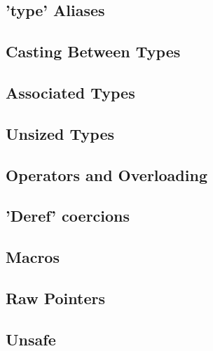 \subsection{'type' Aliases}
\label{sec:syntax_typeAliases}


\subsection{Casting Between Types}
\label{sec:syntax_casting}


\subsection{Associated Types}
\label{sec:syntax_associatedTypes}


\subsection{Unsized Types}
\label{sec:syntax_unsizedTypes}


\subsection{Operators and Overloading}
\label{sec:syntax_operatorsAndOverloading}


\subsection{'Deref' coercions}
\label{sec:syntax_derefCoercions}


\subsection{Macros}
\label{sec:syntax_macros}


\subsection{Raw Pointers}
\label{sec:syntax_rawPointers}


\subsection{Unsafe}
\label{sec:syntax_unsafe}

